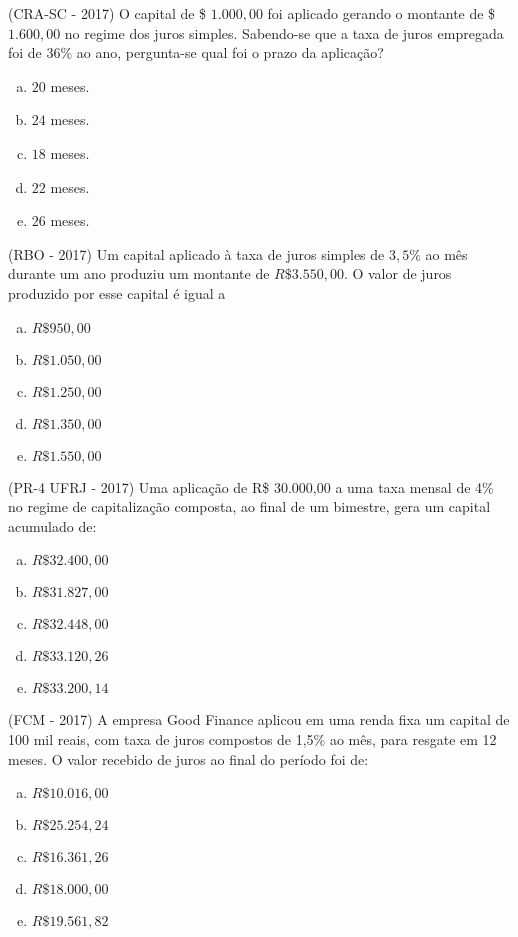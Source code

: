  \begin{exer}
  (CRA-SC - 2017) O capital de \$ $1.000,00$ foi aplicado gerando o montante de \$ $1.600,00$ no regime dos juros simples. Sabendo-se que a taxa de juros empregada foi de $36\%$ ao ano, pergunta-se qual foi o prazo da aplicação?
  \begin{enumerate}[a)]
  \item $20$ meses.
  \item $24$ meses.
  \item $18$ meses.
  \item $22$ meses.
  \item $26$ meses.
  \end{enumerate}
  \end{exer}

  \begin{exer}
  (RBO - 2017) Um capital aplicado à taxa de juros simples de $3,5\%$ ao mês durante um ano produziu um montante de $R\$ 3.550,00$. O valor de juros produzido por esse capital é igual a
  \begin{enumerate}[a)]
  \item $R\$ 950,00$
  \item $R\$ 1.050,00$
  \item $R\$ 1.250,00$
  \item $R\$ 1.350,00$
  \item $R\$ 1.550,00$
  \end{enumerate}
  \end{exer}

  \begin{exer}
  (PR-4 UFRJ - 2017) Uma aplicação de R\$ 30.000,00 a uma taxa mensal de 4\% no regime de capitalização composta, ao final de um bimestre, gera um capital acumulado de:
  \begin{enumerate}[a)]
  \item $R\$ 32.400,00$
  \item $R\$ 31.827,00$
  \item $R\$ 32.448,00$
  \item $R\$ 33.120,26$
  \item $R\$ 33.200,14$
  \end{enumerate}
  \end{exer}

  \begin{exer}
  (FCM - 2017) A empresa Good Finance aplicou em uma renda fixa um capital de 100 mil reais, com taxa de juros compostos de 1,5\% ao mês, para resgate em 12 meses. O valor recebido de juros ao final do período foi de:
  \begin{enumerate}[a)]
  \item $R\$ 10.016,00$
  \item $R\$ 25.254,24$
  \item $R\$ 16.361,26$
  \item $R\$ 18.000,00$
  \item $R\$ 19.561,82$
  \end{enumerate}
  \end{exer}

